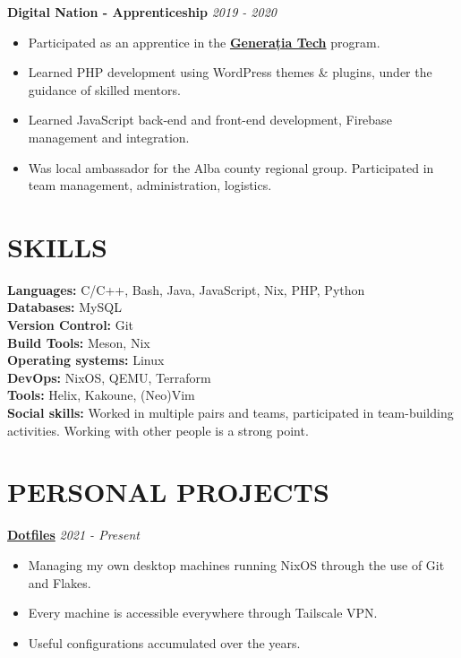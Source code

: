 \documentclass[margin]{res}
\begin{document}
\begin{resume}
  {\bf Digital Nation - Apprenticeship} \hfill \textit{2019 - 2020}\\
  \begin{itemize}
    \item Participated as an apprentice in the \href{https://generatiatech.ro}{\textbf{Generația Tech}} program.
    \item Learned PHP development using WordPress themes \& plugins, under the guidance of skilled mentors.
    \item Learned JavaScript back-end and front-end development, Firebase management and integration.
    \item Was local ambassador for the Alba county regional group. Participated in team management, administration, logistics.
  \end{itemize}

  \section{SKILLS}
  {\bf Languages:} C/C++, Bash, Java, JavaScript, Nix, PHP, Python\\
  {\bf Databases:} MySQL\\
  {\bf Version Control:} Git\\
  {\bf Build Tools:} Meson, Nix\\
  {\bf Operating systems:} Linux\\
  {\bf DevOps:} NixOS, QEMU, Terraform\\
  {\bf Tools:} Helix, Kakoune, (Neo)Vim\\

  {\bf Social skills:} Worked in multiple pairs and teams, participated in team-building activities. Working with other people is a strong point.

  \section{PERSONAL PROJECTS}

  {\bf \href{https://github.com/fufexan/dotfiles}{Dotfiles}} \hfill \textit{2021 - Present}\\
  \begin{itemize}
    \item Managing my own desktop machines running NixOS through the use of Git and Flakes.
    \item Every machine is accessible everywhere through Tailscale VPN.
    \item Useful configurations accumulated over the years.
  \end{itemize}



\end{resume}
\end{document}
